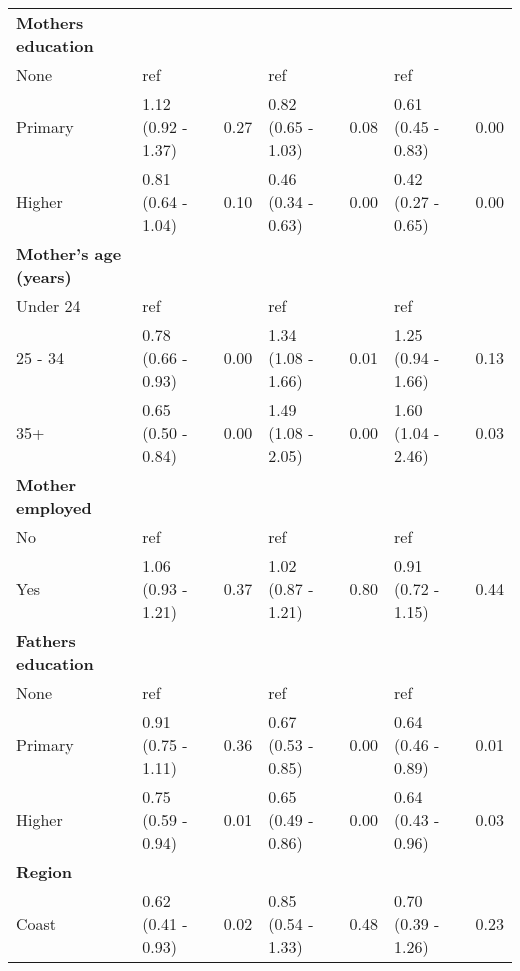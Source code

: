 \documentclass[sn-basic,Numbered,pdflatex]{sn-jnl}
\theoremstyle{remark}
\theoremstyle{definition}
\begin{document}
\begin{table}
\begin{tabular}[t]{>{\raggedright\arraybackslash}p{2cm}llllll}
\textbf{Mothers education} & \textbf{} & \textbf{} & \textbf{} & \textbf{} & \textbf{} & \textbf{}\\
\hspace{1em}None & ref &  & ref &  & ref \vphantom{1} & \\
\hspace{1em}Primary & 1.12 (0.92 - 1.37) & 0.27 & 0.82 (0.65 - 1.03) & 0.08 & 0.61 (0.45 - 0.83) & 0.00\\
\addlinespace
\hspace{1em}Higher & 0.81 (0.64 - 1.04) & 0.10 & 0.46 (0.34 - 0.63) & 0.00 & 0.42 (0.27 - 0.65) & 0.00\\
\textbf{Mother's age (years)} & \textbf{} & \textbf{} & \textbf{} & \textbf{} & \textbf{} & \textbf{}\\
\hspace{1em}Under 24 & ref &  & ref &  & ref & \\
\hspace{1em}25 - 34 & 0.78 (0.66 - 0.93) & 0.00 & 1.34 (1.08 - 1.66) & 0.01 & 1.25 (0.94 - 1.66) & 0.13\\
\hspace{1em}35+ & 0.65 (0.50 - 0.84) & 0.00 & 1.49 (1.08 - 2.05) & 0.00 & 1.60 (1.04 - 2.46) & 0.03\\
\addlinespace
\textbf{Mother employed} & \textbf{} & \textbf{} & \textbf{} & \textbf{} & \textbf{} & \textbf{}\\
\hspace{1em}No & ref &  & ref &  & ref & \\
\hspace{1em}Yes & 1.06 (0.93 - 1.21) & 0.37 & 1.02 (0.87 - 1.21) & 0.80 & 0.91 (0.72 - 1.15) & 0.44\\
\textbf{Fathers education} & \textbf{} & \textbf{} & \textbf{} & \textbf{} & \textbf{} & \textbf{}\\
\hspace{1em}None & ref &  & ref &  & ref & \\
\addlinespace
\hspace{1em}Primary & 0.91 (0.75 - 1.11) & 0.36 & 0.67 (0.53 - 0.85) & 0.00 & 0.64 (0.46 - 0.89) & 0.01\\
\hspace{1em}Higher & 0.75 (0.59 - 0.94) & 0.01 & 0.65 (0.49 - 0.86) & 0.00 & 0.64 (0.43 - 0.96) & 0.03\\
\textbf{Region} & \textbf{} & \textbf{} & \textbf{} & \textbf{} & \textbf{} & \textbf{}\\
\hspace{1em}Coast & 0.62 (0.41 - 0.93) & 0.02 & 0.85 (0.54 - 1.33) & 0.48 & 0.70 (0.39 - 1.26) & 0.23\\

\end{tabular}
\end{table}
\end{document}
